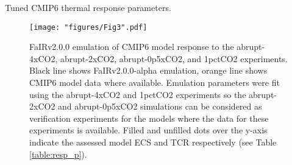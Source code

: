 \documentclass[gmd, manuscript]{copernicus}
\begin{document}
\clearpage
\begin{table}[t]
    \caption{Tuned CMIP6 thermal response parameters.}
    \label{table:resp_p}
    {\footnotesize
    
    }
\end{table}
\clearpage
\begin{figure}[t]
    \texttt{[image: "figures/Fig3".pdf]}
    \caption{FaIRv2.0.0 emulation of CMIP6 model response to the abrupt-4xCO2, abrupt-2xCO2, abrupt-0p5xCO2, and 1pctCO2 experiments. Black line shows FaIRv2.0.0-alpha emulation, orange line shows CMIP6 model data where available. Emulation parameters were fit using the abrupt-4xCO2 and 1pctCO2 experiments so the abrupt-2xCO2 and abrupt-0p5xCO2 simulations can be considered as verification experiments for the models where the data for these experiments is available. Filled and unfilled dots over the y-axis indicate the assessed model ECS and TCR respectively (see Table \ref{table:resp_p}).}
    \label{fig:resp_emulation}
\end{figure}
\clearpage
\end{document}
